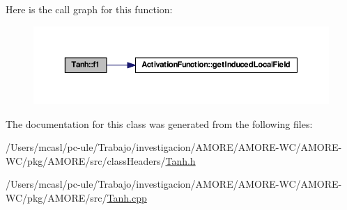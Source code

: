 Here is the call graph for this function:
\nopagebreak
\begin{figure}[H]
\begin{center}
\leavevmode
\includegraphics[width=378pt]{class_tanh_af723894488a3c1adb7dcdefbcc4b360a_cgraph}
\end{center}
\end{figure}




The documentation for this class was generated from the following files:\begin{DoxyCompactItemize}
\item 
/Users/mcasl/pc-\/ule/Trabajo/investigacion/AMORE/AMORE-\/WC/AMORE-\/WC/pkg/AMORE/src/classHeaders/\hyperlink{_tanh_8h}{Tanh.h}\item 
/Users/mcasl/pc-\/ule/Trabajo/investigacion/AMORE/AMORE-\/WC/AMORE-\/WC/pkg/AMORE/src/\hyperlink{_tanh_8cpp}{Tanh.cpp}\end{DoxyCompactItemize}

